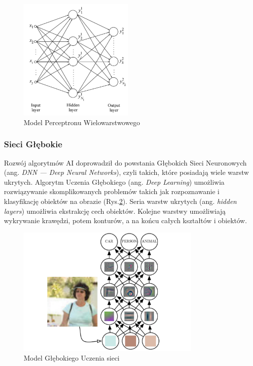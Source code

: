 \begin{figure}
  \centering
  \includegraphics[width=0.5\textwidth]{img/mlp.png}
  \caption{Model Perceptronu Wielowarstwowego}
  \label{mlp}
\end{figure}


\subsubsection{Sieci Głębokie}

Rozwój algorytmów AI doprowadził do powstania Głębokich Sieci Neuronowych (ang. 
\emph{DNN — Deep Neural Networks}), czyli takich, które posiadają wiele 
warstw ukrytych\cite{Goodfellow-et-al-2016}. Algorytm Uczenia Głębokiego (ang. 
\emph{Deep Learning}) umożliwia rozwiązywanie skomplikowanych problemów takich 
jak rozpoznawanie i klasyfikację obiektów na obrazie (Rys.\ref{dnn}). Seria warstw 
ukrytych (ang. \emph{hidden layers}) umożliwia ekstrakcję cech obiektów. 
Kolejne warstwy umożliwiają wykrywanie krawędzi, potem konturów, a na końcu 
całych kształtów i obiektów.

\begin{figure}[!h]
  \centering
  \includegraphics[width=0.8\textwidth]{img/dnn-object-recog.png}
  \caption{Model Głębokiego Uczenia sieci}
  \label{dnn}
\end{figure}


